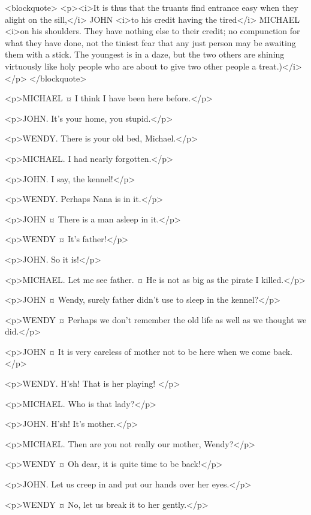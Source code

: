<blockquote> <p><i>It is thus that the truants find entrance easy when they alight on the sill,</i> JOHN <i>to his credit having the tired</i> MICHAEL <i>on his shoulders. They have nothing else to their credit; no compunction for what they have done, not the tiniest fear that any just person may be awaiting them with a stick. The youngest is in a daze, but the two others are shining virtuously like holy people who are about to give two other people a treat.)</i></p> </blockquote>

<p>MICHAEL ¤
I think I have been here before.</p>

<p>JOHN. It's your home, you stupid.</p>

<p>WENDY. There is your old bed, Michael.</p>

<p>MICHAEL. I had nearly forgotten.</p>

<p>JOHN. I say, the kennel!</p>

<p>WENDY. Perhaps Nana is in it.</p>

<p>JOHN ¤
There is a man asleep in it.</p>

<p>WENDY ¤
It's father!</p>

<p>JOHN. So it is!</p>

<p>MICHAEL. Let me see father.
¤
He is not as big as the pirate I killed.</p>

<p>JOHN ¤
Wendy, surely father didn't use to sleep in the kennel?</p>

<p>WENDY ¤
Perhaps we don't remember the old life as well as we thought we did.</p>

<p>JOHN ¤
It is very careless of mother not to be here when we come back.</p>


<p>WENDY. H'sh!
That is her playing!
</p>

<p>MICHAEL. Who is that lady?</p>

<p>JOHN. H'sh! It's mother.</p>

<p>MICHAEL. Then are you not really our mother, Wendy?</p>

<p>WENDY ¤
Oh dear, it is quite time to be back!</p>

<p>JOHN. Let us creep in and put our hands over her eyes.</p>

<p>WENDY ¤
No, let us break it to her gently.</p>

